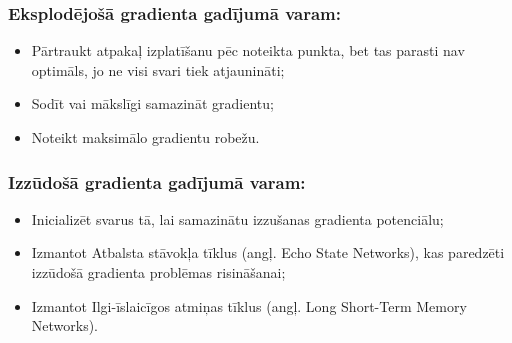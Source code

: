 \documentclass[12pt,paper=A4]{report}
\begin{document}

\subsubsection{Eksplodējošā gradienta gadījumā varam:}
\begin{itemize}
\item Pārtraukt atpakaļ izplatīšanu pēc noteikta punkta, bet tas parasti nav optimāls, jo ne visi svari tiek atjaunināti;
\item Sodīt vai mākslīgi samazināt gradientu;
\item Noteikt maksimālo gradientu robežu.
\end{itemize}

\subsubsection{Izzūdošā gradienta gadījumā varam:}
\begin{itemize}
\item Inicializēt svarus tā, lai samazinātu izzušanas gradienta potenciālu;
\item Izmantot Atbalsta stāvokļa tīklus (angļ. Echo State Networks), kas paredzēti izzūdošā gradienta problēmas risināšanai;
\item Izmantot Ilgi-īslaicīgos atmiņas tīklus (angļ. Long Short-Term Memory 
Networks).
\end{itemize}

 

\end{document}
